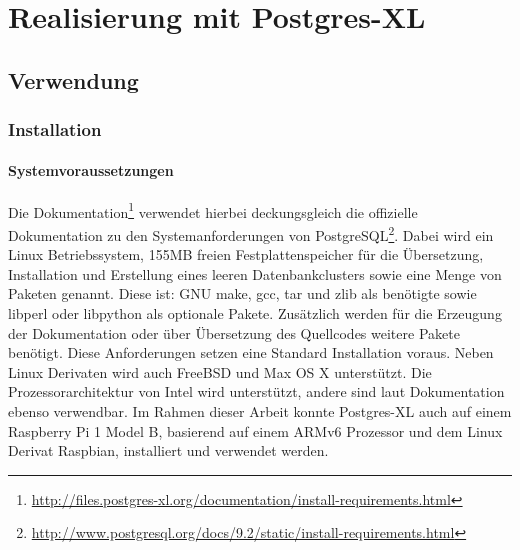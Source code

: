 \chapter{Realisierung mit Postgres-XL}
\label{chapter:postgresxl}

\section{Verwendung}

\subsection{Installation}
\subsubsection{Systemvoraussetzungen}
Die Dokumentation\footnote{\url{http://files.postgres-xl.org/documentation/install-requirements.html}} verwendet hierbei deckungsgleich die offizielle Dokumentation zu den Systemanforderungen von PostgreSQL\footnote{\url{http://www.postgresql.org/docs/9.2/static/install-requirements.html}}.
Dabei wird ein Linux Betriebssystem, 155MB freien Festplattenspeicher für die Übersetzung, Installation und Erstellung eines leeren Datenbankclusters sowie eine Menge von Paketen genannt.
Diese ist: GNU make, gcc, tar und zlib als benötigte sowie libperl oder libpython als optionale Pakete.
Zusätzlich werden für die Erzeugung der Dokumentation oder über Übersetzung des Quellcodes weitere Pakete benötigt.
Diese Anforderungen setzen eine Standard Installation voraus.
Neben Linux Derivaten wird auch FreeBSD und Max OS X unterstützt.
Die Prozessorarchitektur von Intel wird unterstützt, andere sind laut Dokumentation ebenso verwendbar.
Im Rahmen dieser Arbeit konnte Postgres-XL auch auf einem Raspberry Pi 1 Model B, basierend auf einem ARMv6 Prozessor und dem Linux Derivat Raspbian, installiert und verwendet werden.

